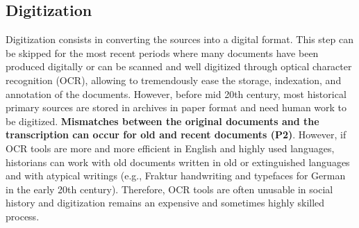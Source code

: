\subsection{Digitization}
Digitization consists in converting the sources into a digital format.
This step can be skipped for the most recent periods where many documents have been produced digitally or can be scanned and well digitized through optical character recognition (OCR), allowing to tremendously ease the storage, indexation, and annotation of the documents.
However, before mid 20th century, most historical primary sources are stored in archives in paper format and need human work to be digitized.
\textbf{Mismatches between the original documents and the transcription can occur for old and recent documents (P2)}.
However, if OCR tools are more and more efficient in English and highly used languages, historians can work with old documents written in old or extinguished languages and with atypical writings (e.g., Fraktur handwriting and typefaces for German in the early 20th century).
Therefore, OCR tools are often unusable in social history and digitization remains an expensive and sometimes highly skilled process.

